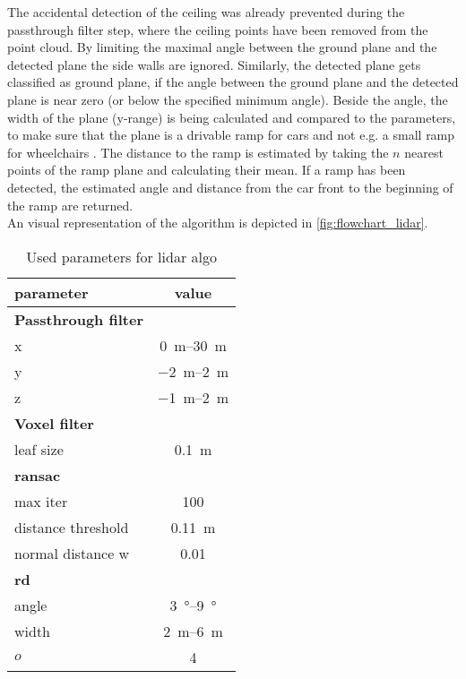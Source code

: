 The accidental detection of the ceiling was already prevented during the passthrough filter step, where the ceiling points have been removed from the point cloud.
By limiting the maximal angle between the ground plane and the detected plane the side walls are ignored.
Similarly, the detected plane gets classified as ground plane, if the angle between the ground plane and the detected plane is near zero (or below the specified minimum angle).
Beside the angle, the width of the plane (y-range) is being calculated and compared to the parameters, to make sure that the plane is a drivable ramp for cars and not e.g. a small ramp for wheelchairs .
The distance to the ramp is estimated by taking the $n$ nearest points of the ramp plane and calculating their mean.
If a ramp has been detected, the estimated angle and distance from the car front to the beginning of the ramp are returned.\\
An visual representation of the algorithm is depicted in \cref{fig:flowchart_lidar}.
\begin{table}[H]
	\centering
	\caption{Used parameters for lidar algo}
	\label{tab:lidar_params}
	\begin{tabular}[t]{lc}
		\toprule
		\textbf{parameter} & \textbf{value}          \\
		\midrule
		\textbf{Passthrough filter}                  \\
		x                  & \SIrange{0}{30}{\metre} \\
		y                  & \SIrange{-2}{2}{\metre} \\
		z                  & \SIrange{-1}{2}{\metre} \\
		\midrule
		\textbf{Voxel filter}                        \\
		leaf size          & \SI{0.1}{\metre}        \\
		\midrule
		\textbf{\gls{ransac}}                        \\
		max iter           & 100                     \\
		distance threshold & \SI{0.11}{\metre}       \\
		normal distance w  & 0.01                    \\
		\midrule
		\textbf{rd}                                  \\
		angle              & \SIrange{3}{9}{\degree} \\
		width              & \SIrange{2}{6}{\metre}  \\
		$o$                & 4                       \\
		\bottomrule
	\end{tabular}
\end{table}%



